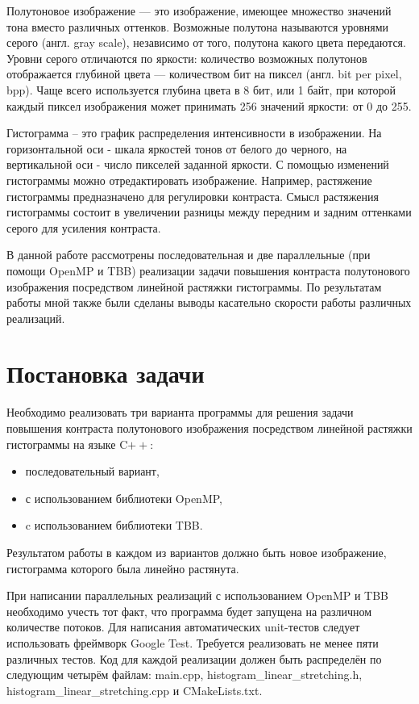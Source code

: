 \documentclass[14pt, russian]{extarticle}
\begin{document}
    Полутоновое изображение — это изображение, имеющее множество значений тона вместо различных оттенков. Возможные полутона называются уровнями серого (англ. gray scale), независимо от того, полутона какого цвета передаются. Уровни серого  отличаются по яркости: количество возможных полутонов отображается глубиной цвета — количеством бит на пиксел (англ. bit per pixel, bpp). Чаще всего используется глубина цвета в 8 бит, или 1 байт, при которой каждый пиксел изображения может принимать 256 значений яркости: от 0 до 255.
    
    Гистограмма – это график распределения интенсивности в изображении. На горизонтальной оси - шкала яркостей тонов от белого до черного, на вертикальной оси - число пикселей заданной яркости. С помощью изменений гистограммы можно отредактировать изображение. Например, растяжение гистограммы предназначено для регулировки контраста. Смысл растяжения гистограммы состоит в увеличении разницы между передним и задним оттенками серого для усиления контраста.

	В данной работе рассмотрены последовательная и две параллельные (при помощи OpenMP и TBB) реализации задачи повышения контраста полутонового изображения посредством линейной растяжки гистограммы. По результатам работы мной также были сделаны выводы касательно скорости работы различных реализаций.
	\newpage

	\section{Постановка задачи}
	Необходимо реализовать три варианта программы для решения задачи повышения контраста полутонового изображения посредством линейной растяжки гистограммы на языке C$++$: 
    \begin{itemize}
    \item{последовательный вариант,}
    \item{с использованием библиотеки OpenMP,}
    \item{c использованием библиотеки TBB.}
    \end{itemize}
	
	Результатом работы в каждом из вариантов должно быть новое изображение, гистограмма которого была линейно растянута.
	
	При написании параллельных реализаций с использованием OpenMP и TBB необходимо учесть тот факт, что программа будет запущена на различном количестве потоков. Для написания автоматических unit-тестов следует использовать фреймворк Google Test. Требуется реализовать не менее пяти различных тестов. Код для каждой реализации должен быть распределён по следующим четырём файлам: main.cpp, histogram\_linear\_stretching.h, histogram\_linear\_stretching.cpp и CMakeLists.txt.
	
\end{document}
